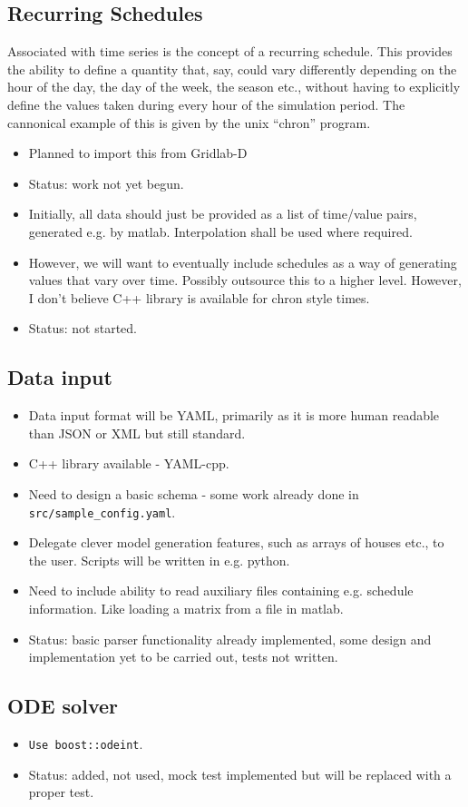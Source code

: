 \documentclass[12pt]{article}
\newcommand{\itm}[1]{\begin{itemize}#1\end{itemize}}
\begin{document}
\subsection{Recurring Schedules}
Associated with time series is the concept of a recurring schedule. This provides the ability to define a quantity that, say, could vary differently depending on the hour of the day, the day of the week, the season etc., without having to explicitly define the values taken during every hour of the simulation period. The cannonical example of this is given by the unix ``chron'' program.
\itm {
	\item Planned to import this from Gridlab-D
	\item Status: work not yet begun.
}

\itm{
	\item Initially, all data should just be provided as a list of time/value pairs, generated e.g. by matlab. Interpolation shall be used where required.
	\item However, we will want to eventually include schedules as a way of generating values that vary over time. Possibly outsource this to a higher level. However, I don't believe C++ library is available for chron style times.
	\item Status: not started.
}


\subsection{Data input}
\itm{
	\item Data input format will be YAML, primarily as it is more human readable than JSON or XML but still standard.
	\item C++ library available - YAML-cpp.
	\item Need to design a basic schema - some work already done in \texttt{src/sample\_config.yaml}.
	\item Delegate clever model generation features, such as arrays of houses etc., to the user. Scripts will be written in e.g. python.
	\item Need to include ability to read auxiliary files containing e.g. schedule information. Like loading a matrix from a file in matlab.
	\item Status: basic parser functionality already implemented, some design and implementation yet to be carried out, tests not written.
}

\subsection{ODE solver}
\itm{
	\item \texttt{Use boost::odeint}.
	\item Status: added, not used, mock test implemented but will be replaced with a proper test.
}
\end{document}
